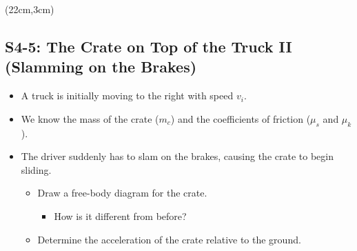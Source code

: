 \documentclass[]{article}
\begin{document}
\begin{textblock*}{5cm}(22cm,3cm)
\centering
{}
\end{textblock*}
\newpage
\begin{TeacherMargin}

\end{TeacherMargin}
\begin{PresentSpace}
\vspace{-10pt}
\section*{S4-5: The Crate on Top of the Truck II (Slamming on the Brakes)}
\vspace{-10pt}
\begin{itemize}
	\item A truck is initially moving to the right with speed $v_{i}$.
	\item We know the mass of the crate ($m_{c}$) and the coefficients of friction ($\mu_{s}$ and $\mu_{k}$).
	\item The driver suddenly has to slam on the brakes, causing the crate to begin sliding.
	\begin{itemize}
		\item Draw a free-body diagram for the crate.
		\begin{itemize}
			\item How is it different from before?
		\end{itemize}
		\item Determine the acceleration of the crate relative to the ground.
	\end{itemize}
\end{itemize}
\end{PresentSpace}
\newpage
\begin{TeacherMargin}

\end{TeacherMargin}
\end{document}
